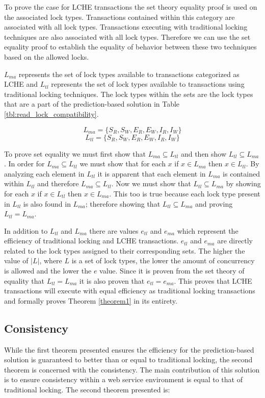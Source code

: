 \documentclass[conference]{IEEEtran}
\begin{document}
To prove the case for LCHE transactions the set theory equality proof is used on the associated lock types. Transactions contained within this category are associated with all lock types. Transactions executing with traditional locking techniques are also associated with all lock types. Therefore we can use the set equality proof to establish the equality of behavior between these two techniques based on the allowed locks. 

$L_{ma}$ represents the set of lock types available to transactions categorized as LCHE and $L_{tl}$ represents the set of lock types available to transactions using traditional locking techniques. The lock types within the sets are the lock types that are a part of the prediction-based solution in Table \ref{tbl:read_lock_compatibility}.

\[\textrm{$L_{ma} = \{S_{R},S_{W},E_{R},E_{W},I_{R},I_{W}\}$}\]
\[\textrm{$L_{tl} = \{S_{R},S_{W},E_{R},E_{W},I_{R},I_{W}\}$}\]

To prove set equality we must first show that $L_{ma} \subseteq L_{tl}$ and then show $L_{tl} \subseteq L_{ma}$. In order for $L_{ma} \subseteq L_{tl}$ we must show that for each $x$ if $x \in L_{ma}$ then $x \in L_{tl}$. By analyzing each element in $L_{tl}$ it is apparent that each element in $L_{ma}$ is contained within $L_{tl}$ and therefore $L_{ma} \subseteq L_{tl}$. Now we must show that $L_{tl} \subseteq L_{ma}$ by showing for each $x$ if $x \in L_{tl}$ then $x \in L_{ma}$. This too is true because each lock type present in $L_{tl}$ is also found in $L_{ma}$; therefore showing that $L_{tl} \subseteq L_{ma}$ and proving $L_{tl} = L_{ma}$.

In addition to $L_{tl}$ and $L_{ma}$ there are values $e_{tl}$ and $e_{ma}$ which represent the efficiency of traditional locking and LCHE transactions. $e_{tl}$ and $e_{ma}$ are directly related to the lock types assigned to their corresponding sets. The higher the value of $\left\vert{L}\right\vert$, where $L$ is a set of lock types, the lower the amount of concurrency is allowed and the lower the $e$ value. Since it is proven from the set theory of equality that $L_{tl} = L_{ma}$ it is also proven that $e_{tl} = e_{ma}$. This proves that LCHE transactions will execute with equal efficiency as traditional locking transactions and formally proves Theorem \ref{theorem1} in its entirety. 

\subsection{Consistency}
While the first theorem presented ensures the efficiency for the prediction-based solution is guaranteed to better than or equal to traditional locking, the second theorem is concerned with the consistency. The main contribution of this solution is to ensure consistency within a web service environment is equal to that of traditional locking. The second theorem presented is:
\end{document}
